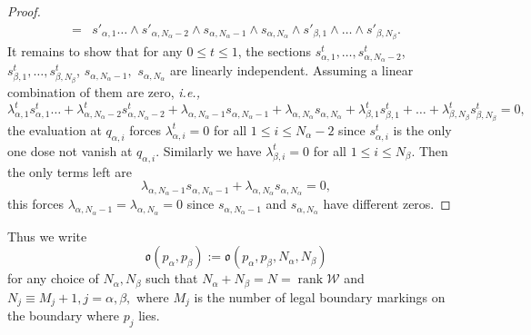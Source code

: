 \documentclass[11pt,a4paper]{article}
\theoremstyle{definition}
\theoremstyle{remark}
\numberwithin{equation}{section}
\begin{document}
\begin{proof}
\begin{equation*}
\begin{split}
        =&s'_{\alpha,1}\dots \wedge s'_{\alpha,N_\alpha-2} \wedge s_{\alpha,N_\alpha-1}\wedge s_{\alpha,N_\alpha}\wedge s'_{\beta,1}\wedge \dots \wedge s'_{\beta,N_\beta}.
    \end{split}
     \end{equation*}
    It remains to show that for any $0\le t \le 1$, the sections $s^t_{\alpha,1},\dots, s^t_{\alpha,N_\alpha-2}$, $s^t_{\beta,1}, \dots , s^t_{\beta,N_\beta}$, $ s_{\alpha,N_\alpha-1},$ $s_{\alpha,N_\alpha}$ are linearly independent. Assuming a linear combination of them are zero, \textit{i.e.,}
    $$
    \lambda^t_{\alpha,1}s^t_{\alpha,1}\dots + \lambda^t_{\alpha,N_\alpha-2}s^t_{\alpha,N_\alpha-2}+ \lambda_{\alpha,N_\alpha-1} s_{\alpha,N_\alpha-1}+ \lambda_{\alpha,N_\alpha} s_{\alpha,N_\alpha}+ \lambda^t_{\beta,1} s^t_{\beta,1}+ \dots + \lambda^t_{\beta,N_\beta} s^t_{\beta,N_\beta}=0,
    $$
    the evaluation at $q_{\alpha,i}$ forces $\lambda^t_{\alpha,i}=0$ for all $1\le i \le N_\alpha-2$ since $s^t_{\alpha,i}$ is the only one dose not vanish at $q_{\alpha,i}$. Similarly we have $\lambda^t_{\beta,i}=0$ for all $1\le i \le N_\beta$. Then the only terms left are 
    $$\lambda_{\alpha,N_\alpha-1} s_{\alpha,N_\alpha-1}+ \lambda_{\alpha,N_\alpha} s_{\alpha,N_\alpha}=0,$$ this forces $\lambda_{\alpha,N_\alpha-1}=\lambda_{\alpha,N_\alpha}=0$ since $s_{\alpha,N_\alpha-1}$ and $s_{\alpha,N_\alpha}$ have different zeros.
\end{proof}

Thus we write
$$
\mathfrak o(p_\alpha,p_\beta):=\mathfrak o(p_\alpha,p_\beta,N_\alpha,N_\beta)
$$
for any choice of $N_\alpha,N_\beta$ such that $N_\alpha+N_\beta=N=\operatorname{rank} \mathcal W$ and $N_j\equiv M_j+1, j=\alpha,\beta,$ where $M_j$ is the number of legal boundary markings on the boundary where $p_j$ lies.

  
\end{document}
